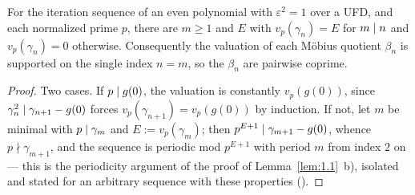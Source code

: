 \begin{theorem}
  \label{thm:valshape}
  \leanok
  For the iteration sequence of an even polynomial with $\varepsilon^2 = 1$ over a UFD, and each
  normalized prime $p$, there are $m \ge 1$ and $E$ with $v_p(\gamma_n) = E$ for $m \mathrel{\mid} n$ and
  $v_p(\gamma_n) = 0$ otherwise. Consequently the valuation of each Möbius quotient $\beta_n$ is
  supported on the single index $n = m$, so the $\beta_n$ are pairwise coprime.
\end{theorem}
\begin{proof}
  \leanok
  Two cases. If $p \mathrel{\mid} g(0)$, the valuation is constantly $v_p(g(0))$, since
  $\gamma_n^2 \mathrel{\mid} \gamma_{n+1} - g(0)$ forces $v_p(\gamma_{n+1}) = v_p(g(0))$ by induction. If
  not, let $m$ be minimal with $p \mathrel{\mid} \gamma_m$ and $E := v_p(\gamma_m)$; then
  $p^{E+1} \mathrel{\mid} \gamma_{m+1} - g(0)$, whence $p \nmid \gamma_{m+1}$, and the sequence is periodic
  mod $p^{E+1}$ with period $m$ from index $2$ on --- this is the periodicity argument of the
  proof of Lemma~\ref{lem:1.1}~b), isolated and stated for an arbitrary sequence with these
  properties ().
\end{proof}

